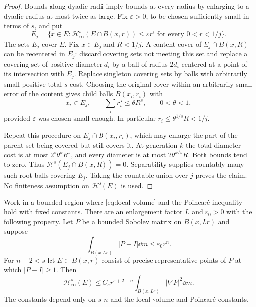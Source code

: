 \begin{proof}
 Bounds along dyadic radii imply bounds at every radius by enlarging
 to a dyadic radius at most twice as large.  Fix $\varepsilon>0$, to be
 chosen sufficiently small in terms of $s$, and put
 \[
 E_j=\{x\in E:\mathcal H^s_\infty(E\cap B(x,r))
                \leq\varepsilon r^s\text{ for every }0<r<1/j\}.
 \]
 The sets $E_j$ cover $E$.  Fix $x\in E_j$ and $R<1/j$.
 A content cover of $E_j\cap B(x,R)$ can be recentered in $E_j$:
 discard covering sets not meeting this set and replace a covering set
 of positive diameter $d_i$ by a ball of radius $2d_i$ centered at a
 point of its intersection with $E_j$.  Replace singleton covering
 sets by balls with arbitrarily small positive total $s$-cost.
 Choosing the original cover within an arbitrarily small error of
 the content gives child balls $B(x_i,r_i)$ with
 \[
  x_i\in E_j,\qquad \sum_i r_i^s\leq\theta R^s,
  \qquad 0<\theta<1,
 \]
 provided $\varepsilon$ was chosen small enough.  In particular
 $r_i\leq\theta^{1/s}R<1/j$.

 Repeat this procedure on $E_j\cap B(x_i,r_i)$, which may enlarge
 the part of the parent set being covered but still covers it.
 At generation $k$ the total diameter cost is at most
 $2^s\theta^kR^s$, and every diameter is at most
 $2\theta^{k/s}R$.  Both bounds tend to zero.  Thus
 $\mathcal H^s(E_j\cap B(x,R))=0$.
 Separability supplies countably many such root balls covering $E_j$.
 Taking the countable union over $j$ proves the claim.  No finiteness
 assumption on $\mathcal H^s(E)$ is used.
\end{proof}

\begin{lemma}
 \label{frames:energy-content}
 Work in a bounded region where \eqref{eq:local-volume} and the
 Poincar\'e inequality hold with fixed constants.  There are an
 enlargement factor $L$ and $\varepsilon_0>0$ with the following
 property.  Let $P$ be a bounded Sobolev matrix on $B(x,Lr)$ and suppose
 \[
  \int_{B(x,Lr)}|P-I|\dd m\leq\varepsilon_0r^n.
 \]
 For $n-2<s$ let $E\subset B(x,r)$ consist of precise-representative
 points of $P$ at which $|P-I|\geq1$.  Then
 \begin{equation}\label{frames:energy-content-bound}
  \mathcal H^s_\infty(E)
   \leq C_s r^{s+2-n}
             \int_{B(x,Lr)}|\nabla P|^2\dd m.
 \end{equation}
 The constants depend only on $s,n$ and the local volume and
 Poincar\'e constants.
\end{lemma}

